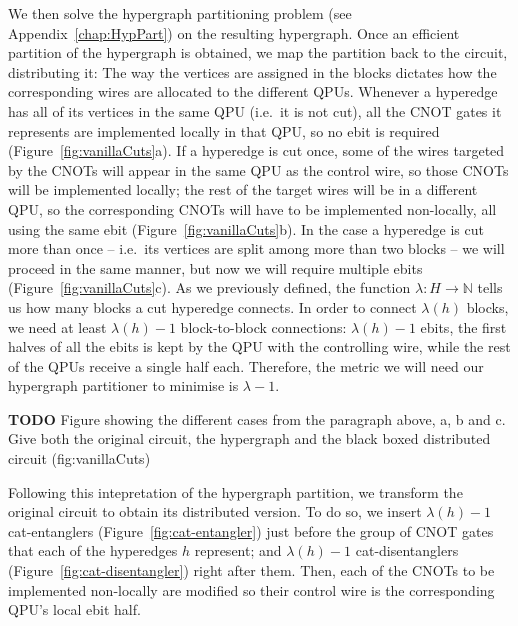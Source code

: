 We then solve the hypergraph partitioning problem (see Appendix~\ref{chap:HypPart}) on the resulting hypergraph. Once an efficient partition of the hypergraph is obtained, we map the partition back to the circuit, distributing it: The way the vertices are assigned in the blocks dictates how the corresponding wires are allocated to the different QPUs. Whenever a hyperedge has all of its vertices in the same QPU (i.e.\ it is not cut), all the CNOT gates it represents are implemented locally in that QPU, so no ebit is required (Figure~\ref{fig:vanillaCuts}a). If a hyperedge is cut once, some of the wires targeted by the CNOTs will appear in the same QPU as the control wire, so those CNOTs will be implemented locally; the rest of the target wires will be in a different QPU, so the corresponding CNOTs will have to be implemented non-locally, all using the same ebit (Figure~\ref{fig:vanillaCuts}b). In the case a hyperedge is cut more than once -- i.e.\ its vertices are split among more than two blocks -- we will proceed in the same manner, but now we will require multiple ebits (Figure~\ref{fig:vanillaCuts}c). As we previously defined, the function \(\lambda\colon H \to \mathbb{N}\) tells us how many blocks a cut hyperedge connects. In order to connect \(\lambda(h)\) blocks, we need at least \(\lambda(h)-1\) block-to-block connections: \(\lambda(h)-1\) ebits, the first halves of all the ebits is kept by the QPU with the controlling wire, while the rest of the QPUs receive a single half each. Therefore, the metric we will need our hypergraph partitioner to minimise is \(\lambda-1\).

\textbf{TODO} Figure showing the different cases from the paragraph above, a, b and c. Give both the original circuit, the hypergraph and the black boxed distributed circuit (fig:vanillaCuts)


Following this intepretation of the hypergraph partition, we transform the original circuit to obtain its distributed version. To do so, we insert \(\lambda(h)-1\) cat-entanglers (Figure~\ref{fig:cat-entangler}) just before the group of CNOT gates that each of the hyperedges \(h\) represent; and \(\lambda(h)-1\) cat-disentanglers (Figure~\ref{fig:cat-disentangler}) right after them. Then, each of the CNOTs to be implemented non-locally are modified so their control wire is the corresponding QPU's local ebit half.



